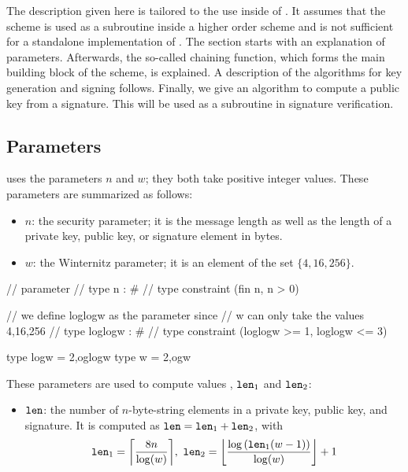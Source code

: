 The description given here is tailored to the use inside of \spx. It assumes that
the scheme is used as a subroutine inside a higher order scheme and is not sufficient
for a standalone implementation of \wotsp. The section starts with an explanation
of parameters. Afterwards, the so-called
chaining function, which forms the main building block of the \wotsp scheme, is
explained. A description of the algorithms for key generation and signing follows.
Finally, we give an algorithm to compute a \wotsp public key from a \wotsp
signature. This will be used as a subroutine in \spx signature verification.

\subsection{\wotsp Parameters}\label{sec:wots:params}
\wotsp uses the parameters $n$ and $w$; they both take positive integer values.
These parameters are summarized as follows:
\begin{itemize}
  \item $n$: the security parameter; it is the message length as well as the
  length of a private key, public key, or signature element in bytes.
  \item $w$: the Winternitz parameter; it is an element of the set $\{4, 16, 256\}$.
\end{itemize}

\begin{code}
//  parameter
//    type n : #
//    type constraint (fin n, n > 0)

    // we define loglogw as the parameter since
    // w can only take the values 4,16,256
//    type loglogw : #
//    type constraint (loglogw >= 1, loglogw <= 3)

  type logw = 2^^loglogw
  type w = 2^^logw
\end{code}

These parameters are used to compute values \len, $\texttt{len}_1$ and
$\texttt{len}_2$:
\begin{itemize}
  \item $\texttt{len}$: the number of $n$-byte-string elements in a \wotsp private
        key, public key, and signature. It is computed as $\texttt{len} =
        \texttt{len}_1 + \texttt{len}_2$, with
        \begin{equation*}
          \len_1 = \ceil*{\frac{8n}{\log(w)}},\
          \len_2 = \floor*{\frac{\log{(\len_1(w - 1))}}{\log(w)}} + 1
        \end{equation*}
\end{itemize}

